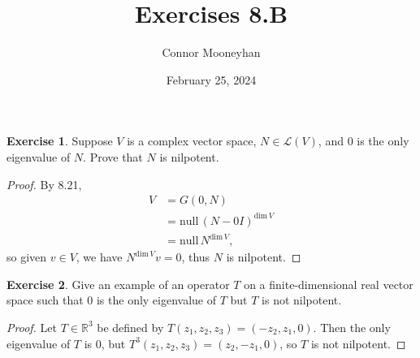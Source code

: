 \documentclass{article}
\title{Exercises 8.B}
\author{Connor Mooneyhan}
\date{February 25, 2024}
\theoremstyle{definition}
\newtheorem{ex}{Exercise}
\begin{document}
\maketitle

\begin{ex}
	Suppose $V$ is a complex vector space, $N \in \mathcal{L}(V)$, and 0 is the only eigenvalue of $N$. Prove that $N$ is nilpotent.
\end{ex}
\begin{proof}
	By 8.21, \begin{align*}
		V & = G(0, N)                                   \\
		  & = \mathrm{null}\,(N - 0I)^{\mathrm{dim}\,V} \\
		  & = \mathrm{null}\,N^{\mathrm{dim}\,V},
	\end{align*}
	so given $v \in V$, we have $N^{\mathrm{dim}\,V}v = 0$, thus $N$ is nilpotent.
\end{proof}

\begin{ex}
	Give an example of an operator $T$ on a finite-dimensional real vector space such that 0 is the only eigenvalue of $T$ but $T$ is not nilpotent.
\end{ex}
\begin{proof}
	Let $T \in \mathbb{R}^3$ be defined by $T(z_1, z_2, z_3) = (-z_2, z_1, 0)$. Then the only eigenvalue of $T$ is $0$, but $T^3(z_1, z_2, z_3) = (z_2, -z_1, 0)$, so $T$ is not nilpotent.
\end{proof}
\end{document}
